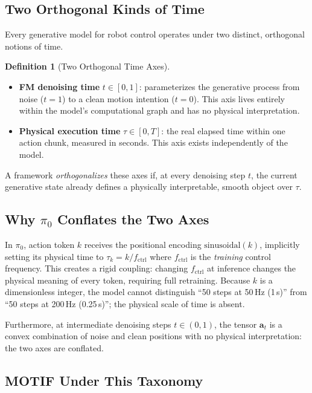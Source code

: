 \documentclass[11pt]{article}
\theoremstyle{plain}
\theoremstyle{definition}
\newtheorem{definition}[theorem]{Definition}
\newcommand{\tdiff}{t}
\newcommand{\texec}{\tau}
\begin{document}
\subsection{Two Orthogonal Kinds of Time}

Every generative model for robot control operates under two distinct,
orthogonal notions of time.

\begin{definition}[Two Orthogonal Time Axes]
\label{def:two_times}
\begin{itemize}[leftmargin=2em,noitemsep]
  \item \textbf{FM denoising time} $\tdiff \in [0,1]$: parameterizes
    the generative process from noise ($\tdiff{=}1$) to a clean
    motion intention ($\tdiff{=}0$).
    This axis lives entirely within the model's computational graph
    and has no physical interpretation.
  \item \textbf{Physical execution time} $\texec \in [0,T]$: the real
    elapsed time within one action chunk, measured in seconds.
    This axis exists independently of the model.
\end{itemize}
A framework \emph{orthogonalizes} these axes if, at every denoising
step $\tdiff$, the current generative state already defines a
physically interpretable, smooth object over $\texec$.
\end{definition}

\subsection{Why $\pi_0$ Conflates the Two Axes}

In $\pi_0$, action token $k$ receives the positional encoding
$\text{sinusoidal}(k)$, implicitly setting its physical time to
$\texec_k = k / f_{\mathrm{ctrl}}$ where $f_{\mathrm{ctrl}}$ is the
\emph{training} control frequency.
This creates a rigid coupling: changing $f_{\mathrm{ctrl}}$ at inference
changes the physical meaning of every token, requiring full retraining.
Because $k$ is a dimensionless integer, the model cannot distinguish
``50 steps at 50\,Hz (1\,s)'' from ``50 steps at 200\,Hz (0.25\,s)'';
the physical scale of time is absent.

Furthermore, at intermediate denoising steps $\tdiff \in (0,1)$, the
tensor $\mathbf{a}_\tdiff$ is a convex combination of noise and clean
positions with no physical interpretation: the two axes are conflated.

\subsection{MOTIF Under This Taxonomy}
\end{document}
